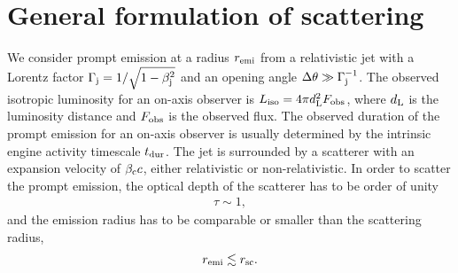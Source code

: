 \documentclass{emulateapj}
\begin{document}
\section{General formulation of scattering}
\label{sec:scattered_prompt}

We consider prompt emission at a radius $r_{\rm emi}$ 
from a relativistic jet 
with a Lorentz factor $\Gamma_{\rm j}=1/\sqrt{1-\beta_{\rm j}^2}$ 
and an opening angle $\Delta\theta \gg \Gamma_{\rm j}^{-1}$.
The observed isotropic luminosity for an on-axis observer is $L_{\rm iso}=4\pi d_{\rm L}^2F_{\rm obs}$, 
where $d_{\rm L}$ is the luminosity distance and $F_{\rm obs}$ is the observed flux. 
The observed duration of the prompt emission for an on-axis observer is usually 
determined by the intrinsic engine activity timescale $t_{\rm dur}$. 
The jet is surrounded by a scatterer with an expansion velocity of $\beta_{\rm c}c$, 
either relativistic or non-relativistic.
In order to scatter the prompt emission, 
the optical depth of the scatterer has to be order of unity
\begin{eqnarray}\label{eq:tau}
\tau \sim 1,
\end{eqnarray}
and the emission radius has to be comparable or
smaller than the scattering radius, 
\begin{equation}\label{eq:r_emi}
r_{\rm emi} \lesssim r_{\rm sc}.
\end{equation}
\end{document}
